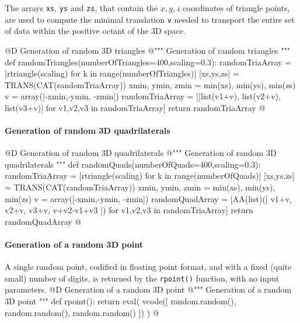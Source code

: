 \documentclass[11pt,oneside]{article}    %
\begin{document}
The arrays \texttt{xs}, \texttt{ys} and \texttt{zs}, that contain the $x,y,z$ coordinates of triangle points, are used to compute the minimal translation \texttt{v} needed to transport the entire set of data within the positive octant of the 3D space. 

@D Generation of random 3D triangles
@{""" Generation of random triangles """
def randomTriangles(numberOfTriangles=400,scaling=0.3):
    randomTriaArray = [rtriangle(scaling) for k in range(numberOfTriangles)]
    [xs,ys,zs] = TRANS(CAT(randomTriaArray))
    xmin, ymin, zmin = min(xs), min(ys), min(zs)
    v = array([-xmin,-ymin, -zmin])
    randomTriaArray = [[list(v1+v), list(v2+v), list(v3+v)] for v1,v2,v3 in randomTriaArray]
    return randomTriaArray
@}

\paragraph{Generation of random 3D quadrilaterals}

@D Generation of random 3D quadrilaterals
@{""" Generation of random 3D quadrilaterals """
def randomQuads(numberOfQuads=400,scaling=0.3):
    randomTriaArray = [rtriangle(scaling) for k in range(numberOfQuads)]
    [xs,ys,zs] = TRANS(CAT(randomTriaArray))
    xmin, ymin, zmin = min(xs), min(ys), min(zs)
    v = array([-xmin,-ymin, -zmin])
    randomQuadArray = [AA(list)([ v1+v, v2+v, v3+v, v+v2-v1+v3 ]) for v1,v2,v3 in randomTriaArray]
    return randomQuadArray
@}


\paragraph{Generation of a random 3D point}
A single random point, codified in floating point format, and with a fixed (quite small) number of digits, is returned by the \texttt{rpoint()} function, with no input parameters.
@D Generation of a random 3D point
@{""" Generation of a random 3D point """
def rpoint():
    return eval( vcode([ random.random(), random.random(), random.random() ]) )
@}
    
\end{document}
